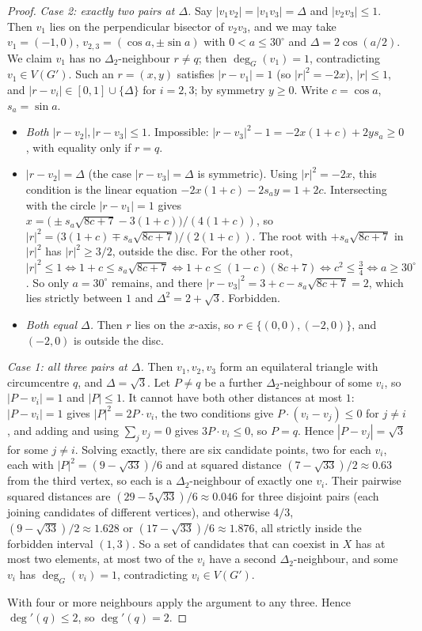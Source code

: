 \documentclass[11pt]{amsart}
\theoremstyle{definition}
\theoremstyle{remark}
\newcommand{\Dt}{\Delta_2}
\begin{document}
\begin{proof}
\emph{Case 2: exactly two pairs at $\Delta$.} Say $|v_1v_2|=|v_1v_3|=\Delta$ and $|v_2v_3|\le1$. Then $v_1$ lies on the perpendicular bisector of $v_2v_3$, and we may take $v_1=(-1,0)$, $v_{2,3}=(\cos a,\pm\sin a)$ with $0<a\le30^\circ$ and $\Delta=2\cos(a/2)$. We claim $v_1$ has no $\Dt$-neighbour $r\ne q$; then $\deg_G(v_1)=1$, contradicting $v_1\in V(G')$. Such an $r=(x,y)$ satisfies $|r-v_1|=1$ (so $|r|^2=-2x$), $|r|\le1$, and $|r-v_i|\in[0,1]\cup\{\Delta\}$ for $i=2,3$; by symmetry $y\ge0$. Write $c=\cos a$, $s_a=\sin a$.
\begin{itemize}[leftmargin=2em]
\item \emph{Both $|r-v_2|,|r-v_3|\le1$.} Impossible: $|r-v_3|^2-1=-2x(1+c)+2ys_a\ge0$, with equality only if $r=q$.
\item \emph{$|r-v_2|=\Delta$} (the case $|r-v_3|=\Delta$ is symmetric). Using $|r|^2=-2x$, this condition is the linear equation $-2x(1+c)-2s_ay=1+2c$. Intersecting with the circle $|r-v_1|=1$ gives $x=\bigl(\pm s_a\sqrt{8c+7}-3(1+c)\bigr)/(4(1+c))$, so $|r|^2=\bigl(3(1+c)\mp s_a\sqrt{8c+7}\bigr)/(2(1+c))$. The root with $+s_a\sqrt{8c+7}$ in $|r|^2$ has $|r|^2\ge3/2$, outside the disc. For the other root, $|r|^2\le1\iff1+c\le s_a\sqrt{8c+7}\iff1+c\le(1-c)(8c+7)\iff c^2\le\frac34\iff a\ge30^\circ$. So only $a=30^\circ$ remains, and there $|r-v_3|^2=3+c-s_a\sqrt{8c+7}=2$, which lies strictly between $1$ and $\Delta^2=2+\sqrt3$. Forbidden.
\item \emph{Both equal $\Delta$.} Then $r$ lies on the $x$-axis, so $r\in\{(0,0),(-2,0)\}$, and $(-2,0)$ is outside the disc.
\end{itemize}

\emph{Case 1: all three pairs at $\Delta$.} Then $v_1,v_2,v_3$ form an equilateral triangle with circumcentre $q$, and $\Delta=\sqrt3$. Let $P\ne q$ be a further $\Dt$-neighbour of some $v_i$, so $|P-v_i|=1$ and $|P|\le1$. It cannot have both other distances at most $1$: $|P-v_i|=1$ gives $|P|^2=2P\cdot v_i$, the two conditions give $P\cdot(v_i-v_j)\le0$ for $j\ne i$, and adding and using $\sum_jv_j=0$ gives $3P\cdot v_i\le0$, so $P=q$. Hence $|P-v_j|=\sqrt3$ for some $j\ne i$. Solving exactly, there are six candidate points, two for each $v_i$, each with $|P|^2=(9-\sqrt{33})/6$ and at squared distance $(7-\sqrt{33})/2\approx0.63$ from the third vertex, so each is a $\Dt$-neighbour of exactly one $v_i$. Their pairwise squared distances are $(29-5\sqrt{33})/6\approx0.046$ for three disjoint pairs (each joining candidates of different vertices), and otherwise $4/3$, $(9-\sqrt{33})/2\approx1.628$ or $(17-\sqrt{33})/6\approx1.876$, all strictly inside the forbidden interval $(1,3)$. So a set of candidates that can coexist in $X$ has at most two elements, at most two of the $v_i$ have a second $\Dt$-neighbour, and some $v_i$ has $\deg_G(v_i)=1$, contradicting $v_i\in V(G')$.

With four or more neighbours apply the argument to any three. Hence $\deg'(q)\le2$, so $\deg'(q)=2$.
\end{proof}
\end{document}
